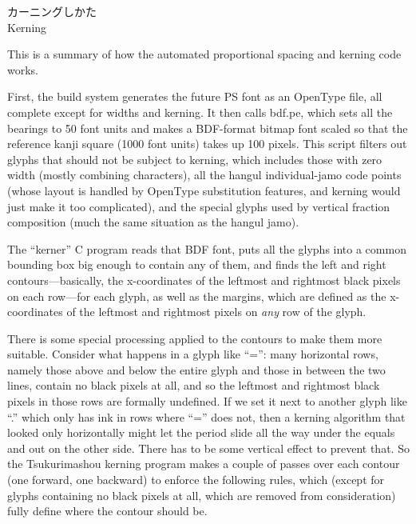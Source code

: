\documentclass[14pt]{extarticle}
\newcommand{\blsection}[2]{%
\kaku\clearpage\Large\phantomsection%
\addcontentsline{toc}{section}{#1 #2}%
#1\\ #2\par\addpenalty{-300}\normalsize}
\begin{document}

\blsection{カーニングしかた}{Kerning}

This is a summary of how the automated proportional spacing and kerning code
works.

First, the build system generates the future PS font as an OpenType file,
all complete except for widths and kerning.  It then calls bdf.pe, which
sets all the bearings to 50 font units and makes a BDF-format
bitmap font scaled so that the reference kanji square (1000 font units)
takes up 100 pixels.  This script filters out glyphs that should not be
subject to kerning, which includes those with zero width (mostly combining
characters), all the hangul individual-jamo code points (whose layout is
handled by OpenType substitution features, and kerning would just make it
too complicated), and the special glyphs used by vertical fraction
composition (much the same situation as the hangul jamo).

The ``kerner'' C program reads that BDF font, puts all the glyphs into a
common bounding box big enough to contain any of them, and finds the left
and right contours---basically, the x-coordinates of the leftmost and
rightmost black pixels on each row---for each glyph, as well as the margins,
which are defined as the x-coordinates of the leftmost and rightmost pixels
on \emph{any} row of the glyph.

There is some special processing applied to the contours to make them more
suitable. Consider what happens in a glyph like ``='': many horizontal rows,
namely those above and below the entire glyph and those in between the two
lines, contain no black pixels at all, and so the leftmost and rightmost
black pixels in those rows are formally undefined.  If we set it next to
another glyph like ``.'' which only has ink in rows where ``='' does not,
then a kerning algorithm that looked only horizontally might let the period
slide all the way under the equals and out on the other side.  There has to
be some vertical effect to prevent that. So the Tsukurimashou kerning
program makes a couple of passes over each contour (one forward, one
backward) to enforce the following rules, which (except for glyphs
containing no black pixels at all, which are removed from consideration)
fully define where the contour should be.
\end{document}

